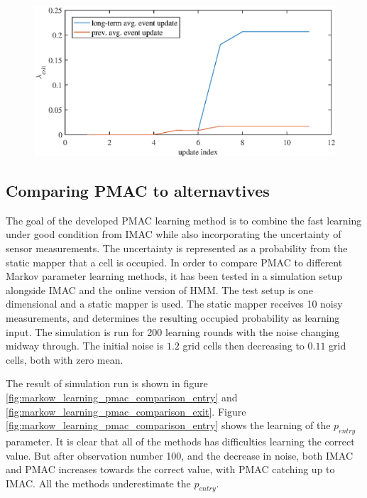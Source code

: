 \begin{figure}[htbp]
    \centering
    \includegraphics[scale=1]{chapters/mapping_of_dynamic_areas/figures/visualization_of_advantage_long_term_average}
    \caption{}
    \label{fig:visualization_of_advantage_long_term_average}
\end{figure}


\subsection{Comparing PMAC to alternavtives}
The goal of the developed PMAC learning method is to combine the fast learning under good condition from IMAC while also incorporating the uncertainty of sensor measurements. The uncertainty is represented as a probability from the static mapper that a cell is occupied. In order to compare PMAC to different Markov parameter learning methods, it has been tested in a simulation setup alongside IMAC and the online version of HMM. The test setup is one dimensional and a static mapper is used. The static mapper receives 10 noisy measurements, and determines the resulting occupied probability as learning input. The simulation is run for 200 learning rounds with the noise changing midway through. The initial noise is \(1.2\) grid cells then decreasing to \(0.11\) grid cells, both with zero mean. 

The result of simulation run is shown in figure \ref{fig:markow_learning_pmac_comparison_entry} and \ref{fig:markow_learning_pmac_comparison_exit}. Figure  \ref{fig:markow_learning_pmac_comparison_entry} shows the learning of the \(p_{entry}\) parameter. It is clear that all of the methods has difficulties learning the correct value. But after observation number 100, and the decrease in noise, both IMAC and PMAC increases towards the correct value, with PMAC catching up to IMAC. All the methods underestimate the \(p_{entry}\).

